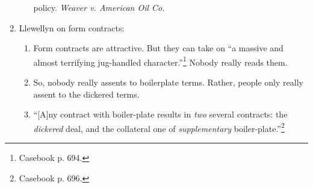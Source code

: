 \begin{enumerate}
\begin{enumerate}
        policy. \emph{Weaver v. American Oil Co.}
    \end{enumerate}
    \item Llewellyn on form contracts: 
    \begin{enumerate}
        \item Form contracts are attractive. But they can take on ``a massive 
        and almost terrifying jug-handled character.''\footnote{Casebook p. 
        694.} Nobody really reads them.
        \item So, nobody really assents to boilerplate terms. Rather, people 
        only really assent to the dickered terms.
        \item ``[A]ny contract with boiler-plate results in \emph{two} several 
        contracts: the \emph{dickered} deal, and the collateral one of 
        \emph{supplementary} boiler-plate.''\footnote{Casebook p. 696.}
    \end{enumerate}
\end{enumerate}

